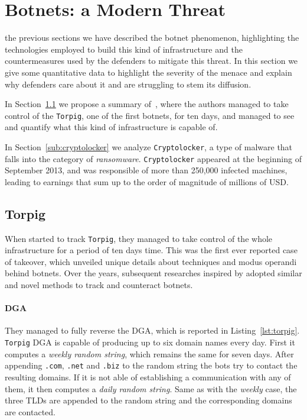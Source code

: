 \section{Botnets: a Modern Threat} %
\label{sec:botnets_a_modern_threat}
 the previous sections we have described the botnet phenomenon,
highlighting the technologies employed to build this kind of infrastructure and
the countermeasures used by the defenders to mitigate this threat. In this section
we give some quantitative data to highlight the severity
of the menace and explain why defenders care about it and are struggling
to stem its diffusion.

In Section~\ref{sub:torpig} we  propose a summary of~\cite{gross2009}, where the
authors managed to take control of the \texttt{Torpig}, one of the first botnets,
for ten days, and managed to see and quantify what this kind of infrastructure is
capable of.

In Section~\ref{sub:cryptolocker} we  analyze \texttt{Cryptolocker}, a type of malware that
falls into the category of \emph{ransomware}. \texttt{Cryptolocker} appeared at the
beginning of September 2013, and was responsible of more than 250,000 infected
machines, leading to earnings that sum up to the order of magnitude of millions
of USD.

\subsection{Torpig} %
\label{sub:torpig}
When \citet{gross2009} started to track \texttt{Torpig}, they managed to take control of the whole
infrastructure for a period of ten days time. This was the first ever reported case
of takeover, which unveiled unique details about techniques and modus operandi behind
botnets. Over the years, subsequent researches inspired by \cite{gross2009} adopted
similar and novel methods to track and counteract botnets.

\paragraph{DGA} They managed to fully reverse the DGA, which is reported in Listing~\ref{lst:torpig}.
\texttt{Torpig} DGA is capable of producing up to six domain names every day. First
it computes a \emph{weekly random string}, which remains the same for seven days.
After appending \texttt{.com}, \texttt{.net} and \texttt{.biz} to the random string
the bots try to contact the resulting domains. If it is not able of establishing a
communication with any of them, it then computes a \emph{daily random string}.
Same as with the \emph{weekly} case, the three TLDs are appended to the random
string and the corresponding domains are contacted.

